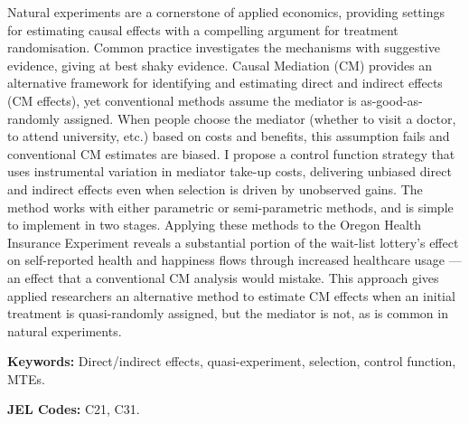 \noindent
Natural experiments are a cornerstone of applied economics, providing settings for estimating causal effects with a compelling argument for treatment randomisation.
Common practice investigates the mechanisms with suggestive evidence, giving at best shaky evidence.
Causal Mediation (CM) provides an alternative framework for identifying and estimating direct and indirect effects (CM effects), yet conventional methods assume the mediator is as-good-as-randomly assigned.
When people choose the mediator (whether to visit a doctor, to attend university, etc.) based on costs and benefits, this assumption fails and conventional CM estimates are biased.
I propose a control function strategy that uses instrumental variation in mediator take-up costs, delivering unbiased direct and indirect effects even when selection is driven by unobserved gains.
The method works with either parametric or semi-parametric methods, and is simple to implement in two stages.
Applying these methods to the Oregon Health Insurance Experiment reveals a substantial portion of the wait-list lottery's effect on self-reported health and happiness flows through increased healthcare usage --- an effect that a conventional CM analysis would mistake.
This approach gives applied researchers an alternative method to estimate CM effects when an initial treatment is quasi-randomly assigned, but the mediator is not, as is common in natural experiments.

\vspace{0.5cm}
\noindent
\textbf{Keywords:}
Direct/indirect effects, quasi-experiment, selection, control function, MTEs.

\vspace{0.1cm}
\noindent
\textbf{JEL Codes:}
C21, C31.
